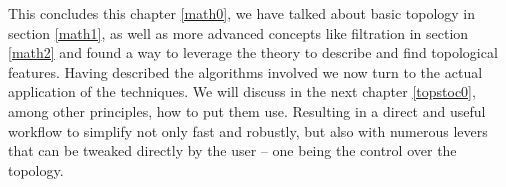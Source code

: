 This concludes this chapter \ref{math0}, we have talked about basic topology in section \ref{math1}, as well as more advanced concepts like filtration in section \ref{math2} and found a way to leverage the theory to describe and find topological features.
Having described the algorithms involved we now turn to the actual application of the techniques.
We will discuss in the next chapter \ref{topstoc0}, among other principles, how to put them use.
Resulting in a direct and useful workflow to simplify not only fast and robustly, but also with numerous levers that can be tweaked directly by the user -- one being the control over the topology.

